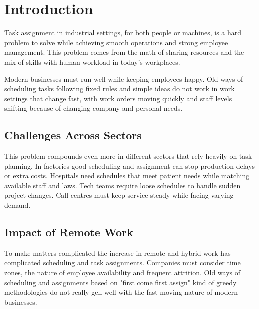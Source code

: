 \documentclass[conference]{IEEEtran}
\begin{document}
	\section{Introduction}
	Task assignment in industrial settings, for both people or machines, is a hard
	problem to solve while achieving smooth operations and strong employee management.
	This problem comes from the math of sharing resources and the mix of skills
	with human workload in today's workplaces.

	Modern businesses must run well while keeping employees happy. Old ways of scheduling
	tasks following fixed rules and simple ideas do not work in work settings that
	change fast, with work orders moving quickly and staff levels shifting because
	of changing company and personal needs.

	\subsection{Challenges Across Sectors}
	This problem compounds even more in different sectors that rely heavily on
	task planning. In factories good scheduling and assignment can stop production
	delays or extra costs. Hospitals need schedules that meet patient needs while
	matching available staff and laws. Tech teams require loose schedules to handle
	sudden project changes. Call centres must keep service steady while facing
	varying demand.

	\subsection{Impact of Remote Work}
	To make matters complicated the increase in remote and hybrid work has
	complicated scheduling and task assignments. Companies must consider time zones,
	the nature of employee availability and frequent attrition. Old ways of scheduling
	and assignments based on "first come first assign" kind of greedy methodologies
	do not really gell well with the fast moving nature of modern businesses.
\end{document}
